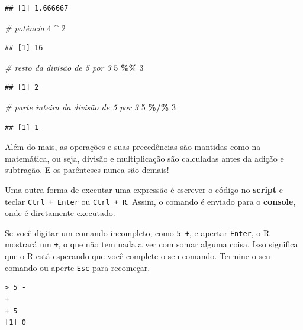 \documentclass[
]{book}
\newenvironment{Shaded}{\begin{snugshade}}{\end{snugshade}}
\newcommand{\CommentTok}[1]{\textcolor[rgb]{0.56,0.35,0.01}{\textit{#1}}}
\newcommand{\DecValTok}[1]{\textcolor[rgb]{0.00,0.00,0.81}{#1}}
\newcommand{\OperatorTok}[1]{\textcolor[rgb]{0.81,0.36,0.00}{\textbf{#1}}}
\newcommand{\StringTok}[1]{\textcolor[rgb]{0.31,0.60,0.02}{#1}}
\begin{document}
\begin{verbatim}
## [1] 1.666667
\end{verbatim}

\begin{Shaded}
\begin{Highlighting}[]
\CommentTok{\# potência}
\DecValTok{4} \OperatorTok{\^{}}\StringTok{ }\DecValTok{2}
\end{Highlighting}
\end{Shaded}

\begin{verbatim}
## [1] 16
\end{verbatim}

\begin{Shaded}
\begin{Highlighting}[]
\CommentTok{\# resto da divisão de 5 por 3}
\DecValTok{5} \OperatorTok{\%\%}\StringTok{ }\DecValTok{3}
\end{Highlighting}
\end{Shaded}

\begin{verbatim}
## [1] 2
\end{verbatim}

\begin{Shaded}
\begin{Highlighting}[]
\CommentTok{\# parte inteira da divisão de 5 por 3}
\DecValTok{5} \OperatorTok{\%/\%}\StringTok{ }\DecValTok{3}  
\end{Highlighting}
\end{Shaded}

\begin{verbatim}
## [1] 1
\end{verbatim}

Além do mais, as operações e suas precedências são mantidas como na matemática, ou seja, divisão e multiplicação são calculadas antes da adição e subtração. E os parênteses nunca são demais!

Uma outra forma de executar uma expressão é escrever o código no \textbf{script} e teclar \texttt{Ctrl\ +\ Enter} ou \texttt{Ctrl\ +\ R}. Assim, o comando é enviado para o \textbf{console}, onde é diretamente executado.

Se você digitar um comando incompleto, como \texttt{5\ +}, e apertar \texttt{Enter}, o R mostrará um \texttt{+}, o que não tem nada a ver com somar alguma coisa. Isso significa que o R está esperando que você complete o seu comando. Termine o seu comando ou aperte \texttt{Esc} para recomeçar.

\begin{verbatim}
> 5 -
+ 
+ 5
[1] 0
\end{verbatim}
\end{document}
